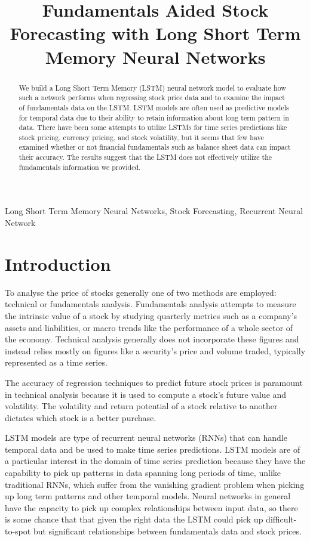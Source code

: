 \documentclass{article}
\title{Fundamentals Aided Stock Forecasting with Long Short Term Memory Neural Networks}
\begin{document}
%
\maketitle
%
\begin{abstract}
We build a Long Short Term Memory (LSTM) neural network model to evaluate how such a network performs when regressing stock price data and to examine the impact of fundamentals data on the LSTM. LSTM models are often used as predictive models for temporal data due to their ability to retain information about long term pattern in data. There have been some attempts to utilize LSTMs for time series predictions like stock pricing, currency pricing, and stock volatility\cite{maknickienė_rutkauskas_maknickas_2011}, but it seems that few have examined whether or not financial fundamentals such as balance sheet data can impact their accuracy. The results suggest that the LSTM does not effectively utilize the fundamentals information we provided.
\end{abstract}
%
\begin{keywords}
Long Short Term Memory Neural Networks, Stock Forecasting, Recurrent Neural Network
\end{keywords}
%
\section{Introduction}
\label{sec:intro}

To analyse the price of stocks generally one of two methods are employed: technical or fundamentals analysis. Fundamentals analysis attempts to measure the intrinsic value of a stock by studying quarterly metrics such as a company’s assets and liabilities, or macro trends like the performance of a whole sector of the economy.  Technical analysis generally does not incorporate these figures and instead relies mostly on figures like a security’s price and volume traded, typically represented as a time series. 

The accuracy of regression techniques to predict future stock prices is paramount in technical analysis because it is used to compute a stock's future value and volatility. The volatility and return potential of a stock relative to another dictates which stock is a better purchase.

LSTM models are type of recurrent neural networks (RNNs) that can handle temporal data and be used to make time series predictions. LSTM models are of a particular interest in the domain of time series prediction because they have the capability to pick up patterns in data spanning long periods of time, unlike traditional RNNs, which suffer from the vanishing gradient problem when picking up long term patterns and other temporal models. Neural networks in general have the capacity to pick up complex relationships between input data, so there is some chance that that given the right data the LSTM could pick up difficult-to-spot but significant relationships between fundamentals data and stock prices.  
\end{document}
